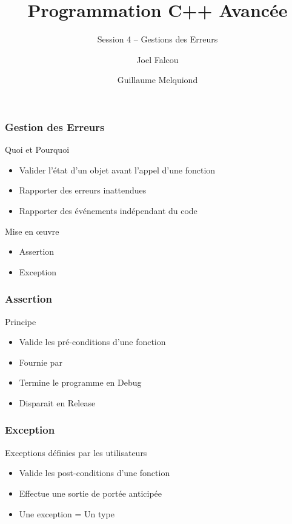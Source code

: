 \documentclass[svgnames]{beamer}
\title{Programmation C++ Avancée}
\subtitle{Session 4 -- Gestions des Erreurs}
\author{Joel Falcou \and Guillaume Melquiond}
\institute{Laboratoire de Recherche en Informatique}
\date{}
\begin{document}


\begin{frame}[plain]
\titlepage
\end{frame}
\setcounter{framenumber}{0}

\frame
{
  \frametitle{Gestion des Erreurs}
  \begin{block}{Quoi et Pourquoi}
  \begin{itemize}
  \item Valider l'état d'un objet avant l'appel d'une fonction
  \item Rapporter des erreurs inattendues
  \item Rapporter des événements indépendant du code
  \end{itemize}
  \end{block}
 
  \begin{block}{Mise en \oe{uvre}}
  \begin{itemize}
  \item Assertion
  \item Exception
  \end{itemize}
  \end{block}
}

\frame
{
  \frametitle{Assertion}
  \begin{block}{Principe}
  \begin{itemize}
  \item Valide les \alert{pré-conditions} d'une fonction
  \item Fournie par 
  \item Termine le programme en Debug
  \item Disparait en Release
  \end{itemize}
  \end{block}
  
}

\frame
{
  \frametitle{Exception}
  \begin{block}{Exceptions définies par les utilisateurs}
  \begin{itemize}
  \item Valide les \alert{post-conditions} d'une fonction
  \item Effectue une sortie de portée anticipée
  \item Une exception = Un type
  \end{itemize}
  \end{block}
  

}
\end{document}
